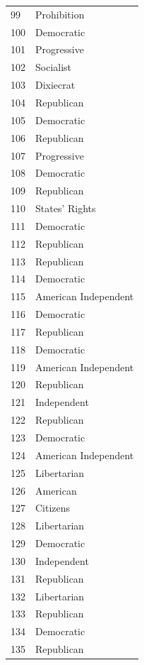 \documentclass[
  letterpaper,
  DIV=11,
  numbers=noendperiod]{scrreprt}
\begin{document}
\begin{tabular}{ll}
99  &            Prohibition \\
100 &             Democratic \\
101 &            Progressive \\
102 &              Socialist \\
103 &              Dixiecrat \\
104 &             Republican \\
105 &             Democratic \\
106 &             Republican \\
107 &            Progressive \\
108 &             Democratic \\
109 &             Republican \\
110 &         States' Rights \\
111 &             Democratic \\
112 &             Republican \\
113 &             Republican \\
114 &             Democratic \\
115 &   American Independent \\
116 &             Democratic \\
117 &             Republican \\
118 &             Democratic \\
119 &   American Independent \\
120 &             Republican \\
121 &            Independent \\
122 &             Republican \\
123 &             Democratic \\
124 &   American Independent \\
125 &            Libertarian \\
126 &               American \\
127 &               Citizens \\
128 &            Libertarian \\
129 &             Democratic \\
130 &            Independent \\
131 &             Republican \\
132 &            Libertarian \\
133 &             Republican \\
134 &             Democratic \\
135 &             Republican \\

\end{tabular}
\end{document}
